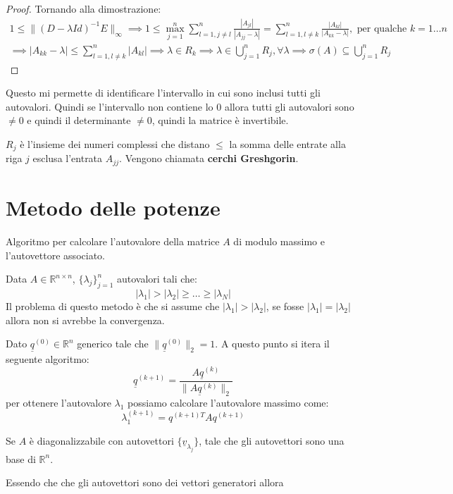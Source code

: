 \begin{teorema} 
\begin{proof}
        Tornando alla dimostrazione:
        \begin{equation*}
            \begin{aligned}
                1 \leq \|(D - \lambda Id)^{-1}E\|_\infty \implies 1 \leq \max_{j = 1}^n
                \sum_{l = 1,j \neq l}^{n} \frac{|A_{jl}|}{|A_{jj} - \lambda|} = 
                \sum_{l = 1,l \neq k}^{n} \frac{|A_{kl}|}{|A_{kk} - \lambda|}, 
                \text{ per qualche }k = 1 \dots n \\ \implies |A_{kk} - \lambda| \leq 
                \sum_{l = 1,l \neq k}^{n} |A_{kl}| \implies \lambda \in R_k \implies 
                \lambda \in \bigcup_{j = 1}^n R_j, \forall \lambda \implies 
                \sigma(A) \subseteq \bigcup_{j = 1}^n R_j
            \end{aligned}
        \end{equation*}
    \end{proof}
\end{teorema}
Questo mi permette di identificare l'intervallo in cui sono inclusi tutti gli
autovalori. Quindi se l'intervallo non contiene lo $0$ allora tutti gli autovalori
sono $\neq 0$ e quindi il determinante $\ne 0$, quindi la matrice è invertibile.
\begin{nota}
    $R_j$ è l'insieme dei numeri complessi che distano $\le$ la somma delle entrate
    alla riga $j$ esclusa l'entrata $A_{jj}$. Vengono chiamata \textbf{cerchi Greshgorin}.
\end{nota}
\section{Metodo delle potenze}
Algoritmo per calcolare l'autovalore della matrice $A$ di modulo massimo e 
l'autovettore associato.

Data $A\in \mathbb{R}^{n\times n}$, $\{\lambda_j\}^n_{j = 1}$ autovalori tali che:
\begin{equation*}
    |\lambda_1|> |\lambda_2| \ge \dots \ge |\lambda_N|
\end{equation*}
Il problema di questo metodo è che si assume che $|\lambda_1|> |\lambda_2|$,
se fosse $|\lambda_1| = |\lambda_2|$ allora non si avrebbe la convergenza.

Dato $\underline{q}^{(0)}\in \mathbb{R}^n$ generico tale che $\|\underline{q}^{(0)}\|_2=1$.
A questo punto si itera il seguente algoritmo:
\begin{equation*}
    \underline{q}^{(k+1)} = \frac{A\underline{q}^{(k)}}{\|A\underline{q}^{(k)}\|_2}
\end{equation*}
per ottenere l'autovalore $\lambda_1$ possiamo calcolare l'autovalore massimo come:
\begin{equation*}
    \lambda_1^{(k + 1)} = q^{(k+1)T}Aq^{(k+1)}
\end{equation*}
\begin{nota}
    Se $A$ è diagonalizzabile con autovettori $\{\underline{v}_{\lambda_j}\}$, 
    tale che gli autovettori sono una base di $\mathbb{R}^n$.
\end{nota}
Essendo che che gli autovettori sono dei vettori generatori allora